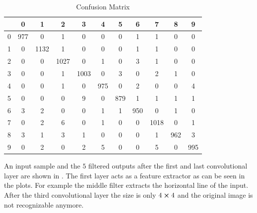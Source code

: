 \documentclass[12pt,a4paper]{scrartcl}
\begin{document}
	
	
	\begin{table}[H]
		\centering
		\begin{tabular}{|c|c|c|c|c|c|c|c|c|c|c|}
			\hline
			\diagbox{$y$}{$\hat{y}$} & 0   & 1    & 2    & 3    & 4   & 5   & 6   & 7    & 8   & 9   \\ \hline
			0              & 977 & 0    & 1    & 0    & 0   & 0   & 1   & 1    & 0   & 0   \\ \hline
			1              & 0   & 1132 & 1    & 0    & 0   & 0   & 1   & 1    & 0   & 0   \\ \hline
			2              & 0   & 0    & 1027 & 0    & 1   & 0   & 3   & 1    & 0   & 0   \\ \hline
			3              & 0   & 0    & 1    & 1003 & 0   & 3   & 0   & 2    & 1   & 0   \\ \hline
			4              & 0   & 0    & 1    & 0    & 975 & 0   & 2   & 0    & 0   & 4   \\ \hline
			5              & 0   & 0    & 0    & 9    & 0   & 879 & 1   & 1    & 1   & 1   \\ \hline
			6              & 3   & 2    & 0    & 0    & 1   & 1   & 950 & 0    & 1   & 0   \\ \hline
			7              & 0   & 2    & 6    & 0    & 1   & 0   & 0   & 1018 & 0   & 1   \\ \hline
			8              & 3   & 1    & 3    & 1    & 0   & 0   & 0   & 1    & 962 & 3   \\ \hline
			9              & 0   & 2    & 0    & 2    & 5   & 0   & 0   & 5    & 0   & 995 \\ \hline
		\end{tabular}
		\caption{Confusion Matrix}
		\label{tab:ex4_2_confusion}
	\end{table}
	
	An input sample and the $5$ filtered outputs after the first and last convolutional layer are shown in . The first layer acts as a feature extractor as can be seen in the plots. For example the middle filter extracts the horizontal line of the input.
	After the third convolutional layer the size is only $4\cross4$ and the original image is not recognizable anymore.
	
\end{document}
